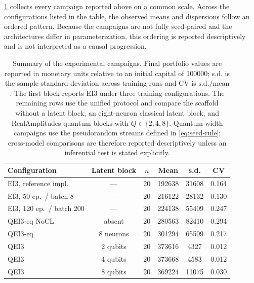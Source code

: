 \documentclass[aps,floatfix,superscriptaddress,twocolumn,tightenlines,amsmath,amssymb,nofootinbib,10pt,longbibliography,prl]{revtex4-2}
\begin{document}
\ref{tab:summary} collects every campaign reported above on a common scale.
Across the configurations listed in the table, the observed means and dispersions follow an
ordered pattern. Because the campaigns are not fully seed-paired and the architectures
differ in parameterization, this ordering is reported descriptively and is not interpreted
as a causal progression.
\begin{table}[htbp]
  \centering
  \caption{Summary of the experimental campaigns. Final portfolio values are reported in monetary
  units relative to an initial capital of \num{100000}; s.d. is the sample standard
  deviation across training runs and CV is $\mathrm{s.d.}/\mathrm{mean}$. The first block
  reports EI3 under three training configurations. The remaining rows use the unified
  protocol and compare the scaffold without a latent block, an eight-neuron classical latent
  block, and RealAmplitudes quantum blocks with $Q\in\{2,4,8\}$. Quantum-width campaigns use
  the pseudorandom streams defined in \ref{eq:seed-rule}; cross-model comparisons are
  therefore reported descriptively unless an inferential test is stated explicitly.}
  \label{tab:summary}
  \begin{tabular}{lccccc}
    \toprule
    Configuration & Latent block & $n$ & Mean & s.d. & CV \\
    \midrule
    EI3, reference impl.      & ---        & 20 & \num{192638} & \num{31608} & 0.164 \\
    EI3, 50 ep.\ / batch 8    & ---        & 20 & \num{216122} & \num{28132} & 0.130 \\
    EI3, 120 ep.\ / batch 200 & ---        & 20 & \num{224138} & \num{55409} & 0.247 \\
    \midrule
    QEI3-eq NoCL              & absent     & 20 & \num{280563} & \num{82410} & 0.294 \\
    QEI3-eq                   & 8 neurons  & 20 & \num{301294} & \num{65509} & 0.217 \\
    \midrule
    QEI3                      & 2 qubits   & 20 & \num{373616} & \num{4327}  & 0.012 \\
    QEI3                      & 4 qubits   & 20 & \num{373668} & \num{4583}  & 0.012 \\
    QEI3                      & 8 qubits   & 20 & \num{369224} & \num{11075} & 0.030 \\
    \bottomrule
  \end{tabular}
\end{table}
\end{document}
